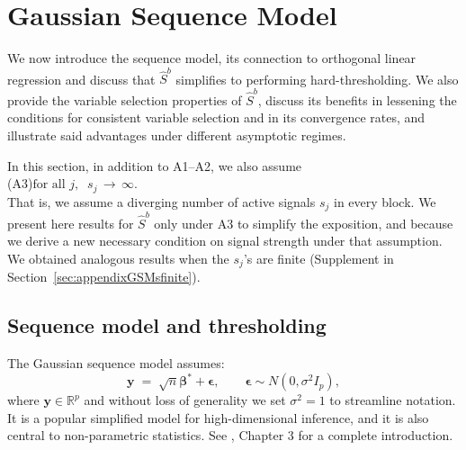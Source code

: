 \documentclass[aos]{imsart}
\theoremstyle{plain}
\newcommand{\bs}{\boldsymbol}
\begin{document}
\section{Gaussian Sequence Model}\label{sec:properties_orth}

We now introduce the sequence model, its connection to orthogonal linear regression and discuss that $\hat S^b$ simplifies to performing hard-thresholding. %
We also provide the variable selection properties of $\hat S^b$, discuss its benefits in lessening the conditions for consistent variable selection and in its convergence rates, and illustrate said advantages under different asymptotic regimes.

In this section, in addition to A1--A2, we also assume\\[5pt]
(A3)\quad $\text{for all } j, \;\; s_j \,\to \, \infty$.\\[5pt]
That is, we assume a diverging number of active signals $s_j$ in every block. %
We present here results for $\hat S^b$ only under A3 to simplify the exposition, and because we derive a new necessary condition on signal strength under that assumption. We obtained analogous results when the $s_j$'s are finite (Supplement in Section~\ref{sec:appendixGSMsfinite}).

\subsection{Sequence model and thresholding}\label{sec:GSMgen}

The Gaussian sequence model assumes:
\begin{equation}\label{eq:GSM}
	\bs y \;=\; \sqrt{n} \bs \beta^* + \bs\epsilon,\qquad \bs \epsilon \sim N(0,\sigma^2 I_p),
\end{equation}
where $\bs y \in \mathbb{R}^p$ and without loss of generality we set $\sigma^2=1$ to streamline notation. It is a popular simplified model for high-dimensional inference, and it is also central to non-parametric statistics. See \cite{johnstone}, Chapter 3 for a complete introduction.
\end{document}
